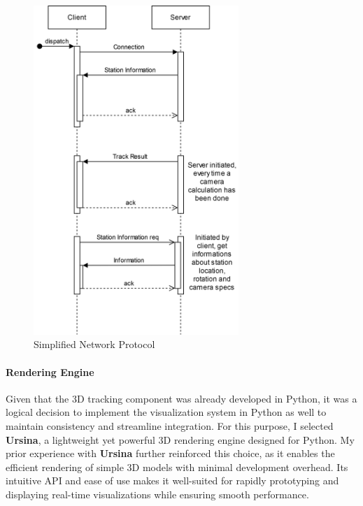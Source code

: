 \begin{figure}[H]
	\centering
	\hspace*{-1.5cm}
	\includegraphics[width=220pt]{figures/SS_Protocol}
	\caption{Simplified Network Protocol}
	\label{fig:ssprotocol}
\end{figure}

\paragraph{Rendering Engine}
Given that the 3D tracking component was already developed in Python, it was a logical decision to implement the visualization system in Python as well to maintain consistency and streamline integration. For this purpose, I selected \textbf{Ursina}, a lightweight yet powerful 3D rendering engine designed for Python. My prior experience with \textbf{Ursina} further reinforced this choice, as it enables the efficient rendering of simple 3D models with minimal development overhead. Its intuitive API and ease of use makes it well-suited for rapidly prototyping and displaying real-time visualizations while ensuring smooth performance.

